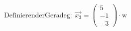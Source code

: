 \documentclass[preview]{standalone}
\begin{document}
\begin{center}
$\mathrm{Definieren der Gerade g: } \: \vec{x_3} = \begin{pmatrix} 5 \\ -1 \\ -3 \end{pmatrix} \cdot \mathrm{w}$
\end{center}
\end{document}
